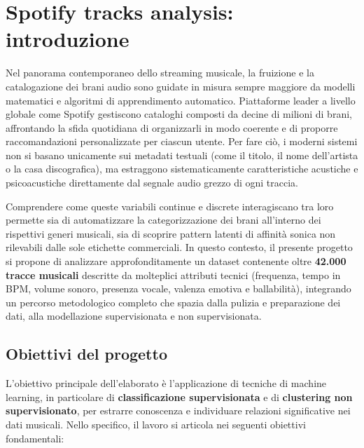 \section{Spotify tracks analysis: introduzione}

Nel panorama contemporaneo dello streaming musicale, la fruizione e la catalogazione dei brani audio sono guidate in misura sempre maggiore da modelli matematici e algoritmi di apprendimento automatico. Piattaforme leader a livello globale come Spotify gestiscono cataloghi composti da decine di milioni di brani, affrontando la sfida quotidiana di organizzarli in modo coerente e di proporre raccomandazioni personalizzate per ciascun utente. Per fare ciò, i moderni sistemi non si basano unicamente sui metadati testuali (come il titolo, il nome dell'artista o la casa discografica), ma estraggono sistematicamente caratteristiche acustiche e psicoacustiche direttamente dal segnale audio grezzo di ogni traccia.

Comprendere come queste variabili continue e discrete interagiscano tra loro permette sia di automatizzare la categorizzazione dei brani all'interno dei rispettivi generi musicali, sia di scoprire pattern latenti di affinità sonica non rilevabili dalle sole etichette commerciali. In questo contesto, il presente progetto si propone di analizzare approfonditamente un dataset contenente oltre \textbf{42.000 tracce musicali} descritte da molteplici attributi tecnici (frequenza, tempo in BPM, volume sonoro, presenza vocale, valenza emotiva e ballabilità), integrando un percorso metodologico completo che spazia dalla pulizia e preparazione dei dati, alla modellazione supervisionata e non supervisionata.

\subsection{Obiettivi del progetto}

L'obiettivo principale dell'elaborato è l'applicazione di tecniche di machine learning, in particolare di \textbf{classificazione supervisionata} e di \textbf{clustering non supervisionato}, per estrarre conoscenza e individuare relazioni significative nei dati musicali. Nello specifico, il lavoro si articola nei seguenti obiettivi fondamentali:

